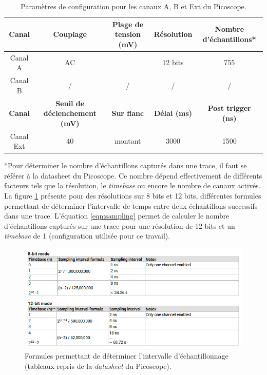 \documentclass[oneside]{book}
\begin{document}
\begin{table}[htbp]
	\hspace{-1.2cm}
	\begin{tabular}{|c||c|c|c|c|}
    		\hline
  		  \textbf{Canal} &\textbf{ Couplage} & \textbf{Plage de tension (\si{\milli\volt})} & \textbf{Résolution} & \textbf{Nombre d'échantillons*} \\ \hline 
		  Canal A & AC & \pm200 & 12 bits & 755\\ \hline 
  		  Canal B &  / & / & / & / \\ \hline \hline 
 		  \textbf{Canal} &  \textbf{Seuil de déclenchement (\si{\milli\volt})} & \textbf{Sur flanc} & \textbf{Délai (\si{\milli\second})} & \textbf{Post trigger (\si{\nano\second})} \\ \hline
 		  Canal Ext &  40 & montant & 3000 & 1500 \\ \hline
	\end{tabular}
    	\caption{Paramètres de configuration pour les canaux A, B et Ext du Picoscope.}
    	\label{tab:picoscope} 
\end{table}

\hspace{-0.5cm}*Pour déterminer le nombre d'échantillons capturés dans une trace, il faut se référer à la datasheet du Picoscope. Ce nombre dépend effectivement de différents facteurs tels que la résolution, le \textit{timebase} ou encore le nombre de canaux activés. La figure \ref{fig:samplingData} présente pour des résolutions sur 8 bits et 12 bits, différentes formules permettant de déterminer l'intervalle de temps entre deux échantillons successifs dans une trace. L'équation \ref{eqn:sampling} permet de calculer le nombre d'échantillons capturés sur une trace pour une résolution de 12 bits et un \textit{timebase} de 1 (configuration utilisée pour ce travail).

\begin{figure}[htbp]
    \centering
    \includegraphics[scale=1.45]{image/samplingData}
    \caption{Formules permettant de déterminer l'intervalle d'échantillonnage (tableaux repris de la \textit{datasheet} du Picoscope).}
    \label{fig:samplingData} 
\end{figure}
\end{document}

